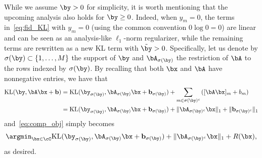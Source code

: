 \documentclass[11pt]{amsart}
\newcommand{\es}[1]{{\color{blue}#1}}
\newcommand{\jc}[1]{{\color{red}#1}}
\begin{document}

\begin{remark}\label{rem:dark_regime}
While we assume $\by>0$ for simplicity, it is worth mentioning that the upcoming analysis also holds for $\by \geq 0$. Indeed, when $y_m=0$, the terms in~\cref{eq:fid_KL} with $y_m=0$ (using the common convention $0 \log 0 = 0$) are linear and can be seen as an analysis-like $\ell_1$-norm regularizer, while the remaining terms are rewritten as a new KL term with $\tilde{\by} > 0$. Specifically, let us denote by
 $\sigma(\by)\subset\{1,\ldots, M\}$ the support of $\by$ and  $\bA_{\sigma(\by)}$ the restriction of $\bA$ to the rows indexed by $\sigma(\by)$. By recalling that both $\bx$ and $\bA$ have nonnegative entries, we have that
$$
\begin{aligned}
\mathrm{KL}(\by,\bA\bx + \mathbf{b})&= \mathrm{KL}(\by_{\sigma(\by)}, \bA_{\sigma(\by)}\bx + \mathbf{b}_{\sigma(\by)})+\sum_{m\in\sigma(\by)^c}\left([\bA\bx]_m + b_m\right)\\
&=\mathrm{KL}(\by_{\sigma(\by)},\bA_{\sigma(\by)}\bx + \mathbf{b}_{\sigma(\by)})+\|\bA_{\sigma(\by)^c}\bx\|_1+\|\mathbf{b}_{\sigma(\by)^c}\|_1
\end{aligned}
$$
and~\cref{eq:comp_obj} simply becomes
$$
\argmin_{\bx\in\cC} \mathrm{KL}(\by_{\sigma(\by)},\bA_{\sigma(\by)}\bx + \mathbf{b}_{\sigma(\by)})+\|\bA_{\sigma(\by)^c}\bx\|_1+R(\bx),
$$
as desired.
\end{remark}

\end{document}

